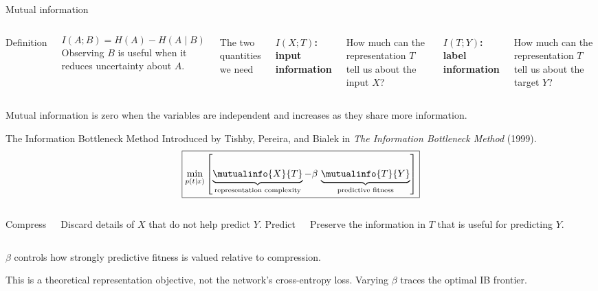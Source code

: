\begin{frame}{Mutual information}
  \begin{columns}[T,onlytextwidth]
      {\color{Accent}\large Definition}\par
      \vspace{0.2cm}
      \[
        I(A;B)=H(A)-H(A\mid B)
      \]
      Observing $B$ is useful when it reduces uncertainty about $A$.

      {\color{Teal}\large The two quantities we need}\par
      \vspace{0.22cm}
      \textbf{$I(X;T)$: input information}\par
      How much can the representation $T$ tell us about the input $X$?
      \vspace{0.45cm}

      \textbf{$I(T;Y)$: label information}\par
      How much can the representation $T$ tell us about the target $Y$?
  \end{columns}
  \vfill
  \centering
  {\color{Muted}\small Mutual information is zero when the variables are independent and increases as they share more information.}
\end{frame}

\begin{frame}{The Information Bottleneck Method}
  \centering
  {\color{Muted}\small Introduced by Tishby, Pereira, and Bialek in
  \emph{The Information Bottleneck Method} (1999).}
  \vspace{-0.05cm}
  \[
    \boxed{
      \min_{p(t\mid x)}
      \left[
        \underbrace{\mutualinfo{X}{T}}_{\text{representation complexity}}
        - \beta\,
        \underbrace{\mutualinfo{T}{Y}}_{\text{predictive fitness}}
      \right]
    }
  \]
  \vspace{0.35cm}
  \begin{columns}[T,onlytextwidth]
      \centering
      {\color{Accent}\large Compress}\par
      \vspace{0.15cm}
      Discard details of $X$ that do not help predict $Y$.
      \centering
      {\color{Teal}\large Predict}\par
      \vspace{0.15cm}
      Preserve the information in $T$ that is useful for predicting $Y$.
  \end{columns}
  \vspace{0.35cm}
  $\beta$ controls how strongly predictive fitness is valued relative to compression.\par
  \vspace{0.12cm}
  {\color{Muted}\small This is a theoretical representation objective, not the
  network's cross-entropy loss. Varying $\beta$ traces the optimal IB frontier.}
\end{frame}


